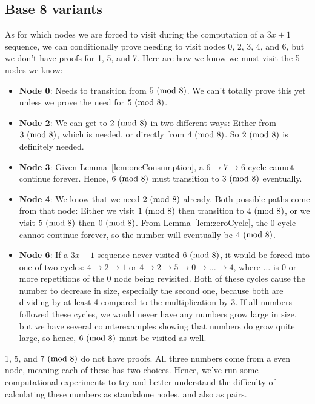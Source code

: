 \subsection{Base 8 variants} \label{subsubsec:base8subprob}
As for which nodes we are forced to visit during the computation of a $3x+1$ sequence, we can conditionally prove needing to visit nodes 0, 2, 3, 4, and 6, but we don't have proofs for 1, 5, and 7. Here are how we know we must visit the 5 nodes we know:


\begin{itemize}
    \item \textbf{Node 0}: Needs to transition from $5\ (\mathrm{mod}\ 8)$. We can't totally prove this yet unless we prove the need for $5\ (\mathrm{mod}\ 8)$.
    \item \textbf{Node 2}: We can get to $2\ (\mathrm{mod}\ 8)$ in two different ways: Either from $3\ (\mathrm{mod}\ 8)$, which is needed, or directly from $4\ (\mathrm{mod}\ 8)$. So $2 \ (\mathrm{mod}\ 8)$ is definitely needed. 
    \item \textbf{Node 3}: Given Lemma~\ref{lem:oneConsumption}, a $6 \rightarrow 7 \rightarrow 6$ cycle cannot continue forever. Hence, $6\ (\mathrm{mod}\ 8)$ must transition to $3\ (\mathrm{mod}\ 8)$ eventually.
    \item \textbf{Node 4}: We know that we need $2\ (\mathrm{mod}\ 8)$ already. Both possible paths come from that node: Either we visit $1\ (\mathrm{mod}\ 8)$ then transition to $4\ (\mathrm{mod}\ 8)$, or we visit $5\ (\mathrm{mod}\ 8)$ then $0\ (\mathrm{mod}\ 8)$. From Lemma~\ref{lem:zeroCycle}, the 0 cycle cannot continue forever, so the number will eventually be $4\ (\mathrm{mod}\ 8)$.
    \item \textbf{Node 6}: If a $3x+1$ sequence never visited $6\ (\mathrm{mod}\ 8)$, it would be forced into one of two cycles: $4 \rightarrow 2 \rightarrow 1$ or $4 \rightarrow 2 \rightarrow 5 \rightarrow 0 \rightarrow \ldots \rightarrow 4$, where $\ldots$ is 0 or more repetitions of the 0 node being revisited. Both of these cycles cause the number to decrease in size, especially the second one, because both are dividing by at least 4 compared to the multiplication by 3. If all numbers followed these cycles, we would never have any numbers grow large in size, but we have several counterexamples showing that numbers do grow quite large, so hence, $6\ (\mathrm{mod}\ 8)$ must be visited as well.
   
\end{itemize}
1, 5, and $7\ (\mathrm{mod}\ 8)$ do not have proofs. All three numbers come from a even node, meaning each of these has two choices. Hence, we've run some computational experiments to try and better understand the difficulty of calculating these numbers as standalone nodes, and also as pairs. 
